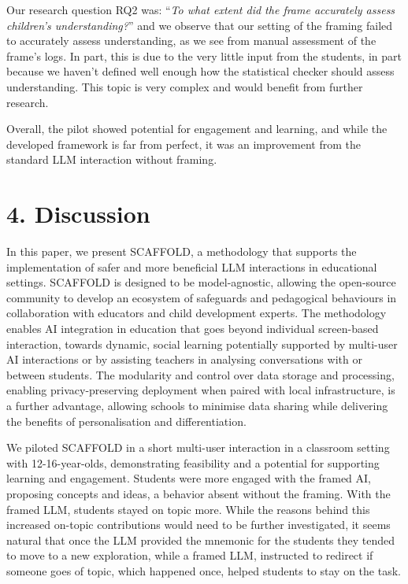 \documentclass[fleqn,10pt]{wlscirep}
\begin{document}
Our research question RQ2 was: ``\textit{To what extent did the frame accurately assess children's understanding?}'' and we observe that our setting of the framing failed to accurately assess understanding, as we see from manual assessment of the frame's logs. In part, this is due to the very little input from the students, in part because we haven't defined well enough how the statistical checker should assess understanding. This topic is very complex and would benefit from further research.

Overall, the pilot showed potential for engagement and learning, and while the developed framework is far from perfect, it was an improvement from the standard LLM interaction without framing.

\section*{4. Discussion}

In this paper, we present SCAFFOLD, a methodology that supports the implementation of safer and more beneficial LLM interactions in educational settings. SCAFFOLD is designed to be model-agnostic, allowing the open-source community to develop an ecosystem of safeguards and pedagogical behaviours in collaboration with educators and child development experts. The methodology enables AI integration in education that goes beyond individual screen-based interaction, towards dynamic, social learning potentially supported by multi-user AI interactions or by assisting teachers in analysing conversations with or between students. The modularity and control over data storage and processing, enabling privacy-preserving deployment when paired with local infrastructure, is a further advantage, allowing schools to minimise data sharing while delivering the benefits of personalisation and differentiation.

We piloted SCAFFOLD in a short multi-user interaction in a classroom setting with 12-16-year-olds, demonstrating feasibility and a potential for supporting learning and engagement. Students were more engaged with the framed AI, proposing concepts and ideas, a behavior absent without the framing. With the framed LLM, students stayed on topic more. While the reasons behind this increased on-topic contributions would need to be further investigated, it seems natural that once the LLM provided the mnemonic for the students they tended to move to a new exploration, while a framed LLM, instructed to redirect if someone goes of topic, which happened once, helped students to stay on the task.
\end{document}
